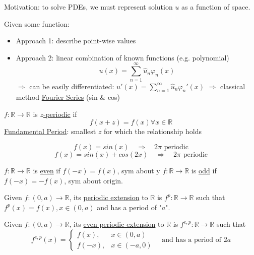 Motivation: to solve PDEs, we must represent solution $u$ as a function of space.

Given some function:
\begin{itemize}[label = ]
    \item Approach 1: describe point-wise values
    \item Approach 2: linear combination of known functions (e.g. polynomial)
    \[u(x) = \sum_{n=1}^{\infty} \hat{u}_n \varphi_n (x)\]
    $\Rightarrow$ can be easily differentiated: $u'(x) = \sum_{n=1}^{\infty}\hat{u}_n \varphi_n'(x)$
    $\Rightarrow$ classical method \underline{Fourier Series} (sin \& cos)
\end{itemize}

\begin{definition}
    $f: \mathbb{R} \rightarrow \mathbb{R} $ is \underline{$z$-periodic} if
    \[f(x+z) = f(x) \forall x \in \mathbb{R} \]
    \underline{Fundamental Period}: smallest $z$ for which the relationship holds
\end{definition}

\begin{example}
    \[f(x) = sin(x) \quad \Rightarrow \quad 2\pi \text{ periodic}\]
    \[f(x) = sin(x) + cos(2x) \quad \Rightarrow \quad 2\pi \text{ periodic}\]
\end{example}

\begin{definition}
    \(f:{ \mathbb{R} \rightarrow \mathbb{R}}\) is \underline{even} if $f(-x) = f(x)$, sym about y
    \(f: {\mathbb{R} \rightarrow \mathbb{R}}\) is \underline{odd} if $f(-x) = -f(x)$, sym about origin.
\end{definition}

\begin{definition}
    Given $f:(0, a) \rightarrow \mathbb{R}$, its \underline{periodic extension} to $\mathbb{R} $ is $f^p: \mathbb{R} \rightarrow \mathbb{R}$ such that $f^p(x) = f(x), x \in(0,a)$ and has a period of "$a$".
\end{definition}

\begin{definition}
    Given $f:(0, a) \rightarrow \mathbb{R}$, its \underline{even periodic extension} to $\mathbb{R} $ is $f^{e,p}: \mathbb{R} \rightarrow \mathbb{R}$ such that
    \[
    f^{e,p}(x) = \begin{cases}
        f(x), & x \in (0,a) \\
        f(-x), & x\in(-a, 0)
    \end{cases} \quad \text{and has a period of } 2a
    \]
\end{definition}

